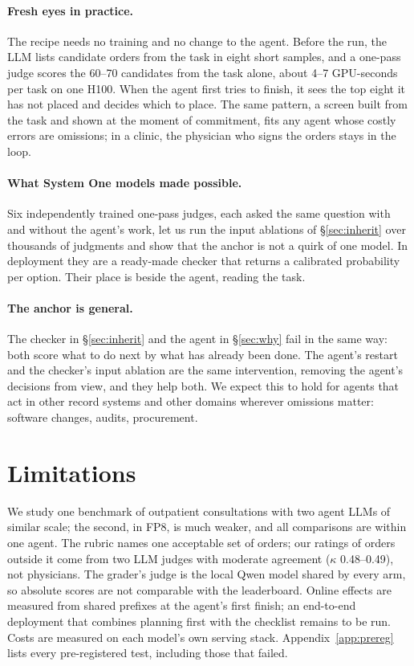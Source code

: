 \documentclass[11pt]{article}
\begin{document}
\paragraph{Fresh eyes in practice.} The recipe needs no training and no change to the agent. Before the run, the
LLM lists candidate orders from the task in eight short samples, and a one-pass judge scores the 60--70 candidates
from the task alone, about 4--7 GPU-seconds per task on one H100. When the agent first tries to finish, it sees the
top eight it has not placed and decides which to place. The same pattern, a screen built from the task and shown at
the moment of commitment, fits any agent whose costly errors are omissions; in a clinic, the physician who signs the
orders stays in the loop.

\paragraph{What System One models made possible.} Six independently trained one-pass judges, each asked the same
question with and without the agent's work, let us run the input ablations of \S\ref{sec:inherit} over thousands of
judgments and show that the anchor is not a quirk of one model. In deployment they are a ready-made checker that
returns a calibrated probability per option. Their place is beside the agent, reading the task.

\paragraph{The anchor is general.} The checker in \S\ref{sec:inherit} and the agent in \S\ref{sec:why} fail in the same
way: both score what to do next by what has already been done. The agent's restart and the checker's input ablation
are the same intervention, removing the agent's decisions from view, and they help both. We expect this to hold for
agents that act in other record systems and other domains wherever omissions matter: software changes, audits,
procurement.

\section*{Limitations}

We study one benchmark of outpatient consultations with two agent LLMs of similar scale; the second, in FP8, is much
weaker, and all comparisons are within one agent. The rubric names one acceptable set of orders; our ratings of
orders outside it come from two LLM judges with moderate agreement ($\kappa$ 0.48--0.49), not physicians. The grader's
judge is the local Qwen model shared by every arm, so absolute scores are not comparable with the leaderboard.
Online effects are measured from shared prefixes at the agent's first finish; an end-to-end deployment that combines
planning first with the checklist remains to be run. Costs are measured on each model's own serving stack.
Appendix~\ref{app:prereg} lists every pre-registered test, including those that failed.
\end{document}

